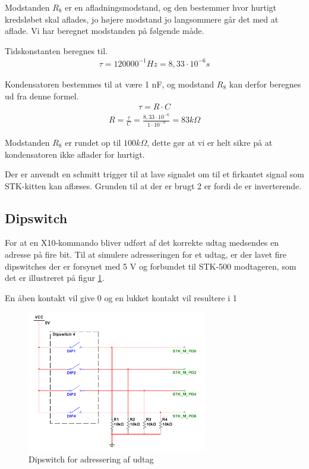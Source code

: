 Modstanden $R_8$ er en afladningsmodstand, og den bestemmer hvor hurtigt kredsløbet skal aflades, jo højere modstand jo langsommere går det med at aflade. Vi har beregnet modstanden på følgende måde.

Tidskonstanten beregnes til.
\begin{align}
\tau = 120000^{-1} Hz = 8,33 \cdot 10^{-6} s
\end{align}


Kondensatoren bestemmes til at være 1 nF, og modstand $R_8$ kan derfor beregnes ud fra denne formel.
\begin{align}
\tau = R \cdot C 
\end{align}
\begin{align}
R = \frac{\tau}{C} = \frac{8,33 \cdot 10^{-6}}{1 \cdot 10^{-9}} = 83 k\Omega
\end{align}

Modstanden $R_8$ er rundet op til $100 k\Omega$, dette gør at vi er helt sikre på at kondensatoren ikke aflader for hurtigt. 

Der er anvendt en schmitt trigger til at lave signalet om til et firkantet signal som STK-kitten kan aflæses. Grunden til at der er brugt 2 er fordi de er inverterende. 

\newpage
\subsection{Dipswitch}
For at en X10-kommando bliver udført af det korrekte udtag medsendes en adresse på fire bit.
Til at simulere adresseringen for et udtag, er der lavet fire dipswitches der er forsynet med 5 V og forbundet til STK-500 modtageren, som det er illustreret på figur \ref{fig:DIPSWITCH}.

En åben kontakt vil give 0 og en lukket kontakt vil resultere i 1

\begin{figure}[htbp]
	\centering
	\includegraphics[width=0.70\textwidth]{billeder/HWdesign/DIPSWITCH}
	\caption{Dipswitch for adressering af udtag}
	\label{fig:DIPSWITCH}
\end{figure}

